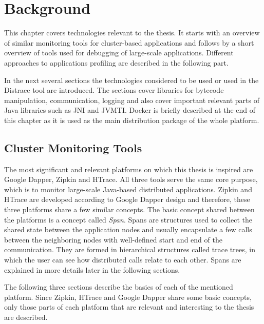 \chapter{Background}
\label{chap:background}
This chapter covers technologies relevant to the thesis. It starts with an overview of similar monitoring tools for cluster-based applications and follows by a short overview of tools used for debugging of large-scale applications. Different approaches to applications profiling are described in the following part. 

In the next several sections the technologies considered to be used or used in the Distrace tool are introduced. The sections cover libraries for bytecode manipulation, communication, logging and also cover important relevant parts of Java libraries such as JNI and JVMTI. Docker is briefly described at the end of this chapter as it is used as the main distribution package of the whole platform.

\section{Cluster Monitoring Tools}
The most significant and relevant platforms on which this thesis is inspired are Google Dapper, Zipkin and HTrace. All three tools serve the same core purpose, which is to monitor large-scale Java-based distributed applications. Zipkin and HTrace are developed according to Google Dapper design and therefore, these three platforms share a few similar concepts. The basic concept shared between the platforms is a concept called \textit{Span}. Spans are structures used to collect the shared state between the application nodes and usually encapsulate a few calls between the neighboring nodes with well-defined start and end of the communication. They are formed in hierarchical structures called trace trees, in which the user can see how distributed calls relate to each other. Spans are explained in more details later in the following sections. 

The following three sections describe the basics of each of the mentioned platform. Since Zipkin, HTrace and Google Dapper share some basic concepts, only those parts of each platform that are relevant and interesting to the thesis are described.
